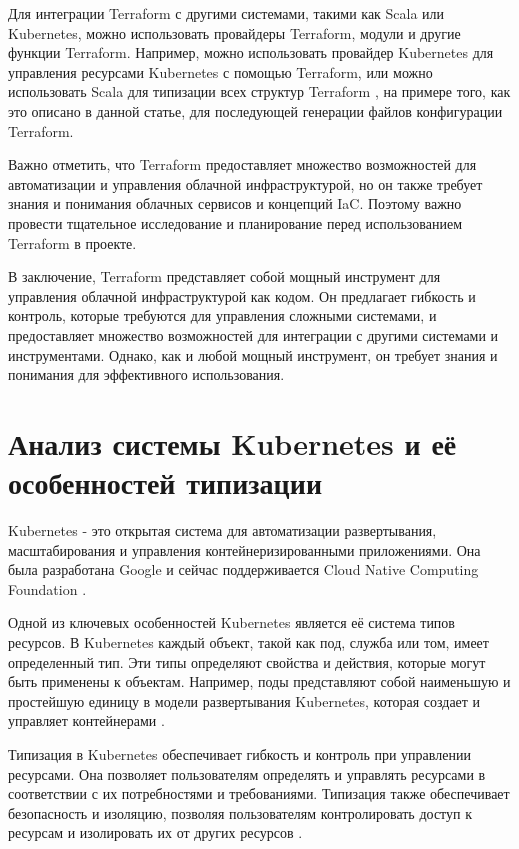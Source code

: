 Для интеграции Terraform с другими системами, такими как Scala или
Kubernetes, можно использовать провайдеры Terraform, модули и другие
функции Terraform. Например, можно использовать провайдер Kubernetes
для управления ресурсами Kubernetes с помощью Terraform, или можно
использовать Scala для типизации всех структур
Terraform \cite{shapkin-automation-2022}, на примере того,
как это описано в данной статье, для последующей
генерации файлов конфигурации Terraform.

Важно отметить, что Terraform предоставляет множество возможностей
для автоматизации и управления облачной инфраструктурой, но он также
требует знания и понимания облачных сервисов и концепций IaC.
Поэтому важно провести тщательное исследование и планирование перед
использованием Terraform в проекте.

В заключение, Terraform представляет собой мощный инструмент для
управления облачной инфраструктурой как кодом. Он предлагает гибкость
и контроль, которые требуются для управления сложными системами,
и предоставляет множество возможностей для интеграции с другими
системами и инструментами. Однако, как и любой мощный инструмент,
он требует знания и понимания для эффективного использования.

\section{Анализ системы Kubernetes и её особенностей типизации}

Kubernetes - это открытая система для автоматизации развертывания,
масштабирования и управления контейнеризированными приложениями.
Она была разработана Google и сейчас поддерживается Cloud Native Computing
Foundation \cite{bernstein-containers-2014}.

Одной из ключевых особенностей Kubernetes является её система типов
ресурсов. В Kubernetes каждый объект, такой как под, служба или том,
имеет определенный тип. Эти типы определяют свойства и действия, которые
могут быть применены к объектам. Например, поды представляют собой
наименьшую и простейшую единицу в модели развертывания Kubernetes,
которая создает и управляет контейнерами \cite{sayfan2017mastering}.

Типизация в Kubernetes обеспечивает гибкость и контроль при управлении
ресурсами. Она позволяет пользователям определять и управлять ресурсами
в соответствии с их потребностями и требованиями. Типизация также
обеспечивает безопасность и изоляцию, позволяя пользователям контролировать
доступ к ресурсам и изолировать их от других ресурсов \cite{bijon2014formal}.

